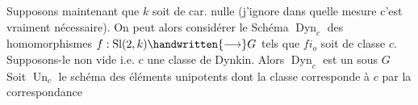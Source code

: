 Supposons maintenant que $k$ soit de car. nulle (j'ignore dans quelle mesure c'est vraiment nécessaire). On peut alors considérer le Schéma $\operatorname{Dyn}_c$ des homomorphismes $f:\operatorname{Sl}(2,k)\handwritten{\longrightarrow}G$ tels que $fi_o$ soit de classe $c$. Supposons-le non vide i.e. $c$ une classe de Dynkin. Alors $\operatorname{Dyn}_c$ est un  sous $G$ Soit $\operatorname{Un}_c$ le schéma des éléments unipotents dont la classe corresponde à  $c$ par la correspondance
